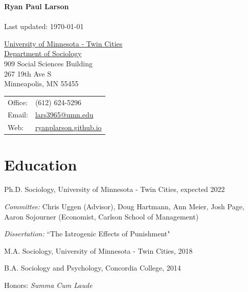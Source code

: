 \documentclass[letterpaper]{article}
\def\name{Ryan Paul Larson}
\renewenvironment{itemize}{
  \begin{list}{}{
    \setlength{\leftmargin}{1.5em}
  }
}{
  \end{list}
}
\begin{document}
\textbf{{\huge \name}}\\
\\
Last updated: \today


\vspace{0.25in}

\begin{minipage}{0.45\linewidth}
  \href{http://www.umn.edu/}{University of Minnesota - Twin Cities} \\
   \href{http://cla.umn.edu/sociology}{Department of Sociology} \\
  909 Social Sciences Building \\
  267 19th Ave S \\
  Minneapolis, MN 55455
\end{minipage}
\begin{minipage}{0.45\linewidth}
  \begin{tabular}{ll}
    Office: & (612) 624-5296 \\
    Email: & \href{mailto:lars3965@umn.edu}{lars3965@umn.edu} \\
    Web: & \href{https://ryanplarson.github.io/personal_site/}{ryanplarson.github.io} \\
  \end{tabular}
\end{minipage}



\section*{\textbf{Education}}

\begin{itemize}
  \item Ph.D. Sociology, University of Minnesota - Twin Cities, expected 2022
   \begin{itemize}
	\item \textit{Committee:} Chris Uggen (Advisor),  Doug Hartmann, Ann Meier, Josh Page, Aaron Sojourner (Economist, Carlson School of Management)
           \item \textit{Dissertation:} ``The Iatrogenic Effects of Punishment"
\end{itemize}
    
\item M.A. Sociology, University of Minnesota - Twin Cities, 2018

 \item B.A. Sociology and Psychology, Concordia College, 2014
 \begin{itemize}
     \item Honors: \textit{Summa Cum Laude}
    \end{itemize}
\end{itemize}
\end{document}
